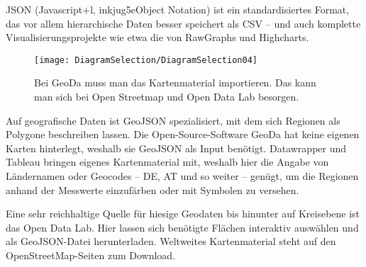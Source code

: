 JSON (Javascript+l, inkjug5eObject Notation) ist ein standardisiertes Format, das vor allem hierarchische Daten besser speichert als CSV – und auch komplette Visualisierungsprojekte wie etwa die von RawGraphs und Highcharts.	

\begin{figure}
	\texttt{[image: DiagramSelection/DiagramSelection04]}
	\caption[GeoDa]{Bei GeoDa muss man das Kartenmaterial importieren. Das kann man sich bei Open Streetmap und Open Data Lab besorgen.}
\end{figure}

Auf geografische Daten ist GeoJSON spezialisiert, mit dem sich Regionen als Polygone beschreiben lassen. Die Open-Source-Software GeoDa hat keine eigenen Karten hinterlegt, weshalb sie GeoJSON als Input benötigt. Datawrapper und Tableau bringen eigenes Kartenmaterial mit, weshalb hier die Angabe von Ländernamen oder Geocodes – DE, AT und so weiter – genügt, um die Regionen anhand der Messwerte einzufärben oder mit Symbolen zu versehen.

Eine sehr reichhaltige Quelle für hiesige Geodaten bis hinunter auf Kreisebene ist das Open Data Lab. Hier lassen sich benötigte Flächen interaktiv auswählen und als GeoJSON-Datei herunterladen. Weltweites Kartenmaterial steht auf den OpenStreetMap-Seiten zum Download.

